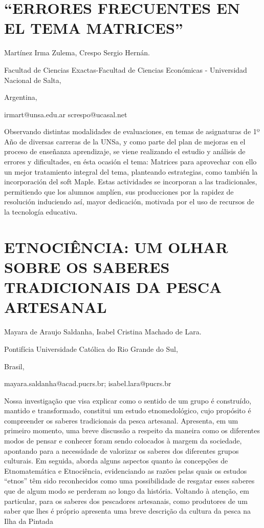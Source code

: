 \section{“ERRORES FRECUENTES EN EL TEMA MATRICES” }

\begin{datos}

Martínez Irma Zulema, Crespo Sergio Hernán.

Facultad de Ciencias Exactas-Facultad de Ciencias Económicas - Universidad
Nacional de Salta,

Argentina,

irmart@unsa.edu.ar screspo@ucasal.net 

\end{datos}

Observando distintas modalidades de evaluaciones, en temas de asignaturas
de 1º Año de diversas carreras de la UNSa, y como parte del plan de
mejoras en el proceso de enseñanza aprendizaje, se viene realizando
el estudio y análisis de errores y dificultades, en ésta ocasión el
tema: Matrices para aprovechar con ello un mejor tratamiento integral
del tema, planteando estrategias, como también la incorporación del
soft Maple. Estas actividades se incorporan a las tradicionales, permitiendo
que los alumnos amplíen, sus producciones por la rapidez de resolución
induciendo así, mayor dedicación, motivada por el uso de recursos
de la tecnología educativa. 


\section{ETNOCIÊNCIA: UM OLHAR SOBRE OS SABERES TRADICIONAIS DA PESCA ARTESANAL }

\begin{datos}

Mayara de Araujo Saldanha, Isabel Cristina Machado de Lara.

Pontifícia Universidade Católica do Rio Grande do Sul,

Brasil,

mayara.saldanha@acad.pucrs.br; isabel.lara@pucrs.br

\end{datos}

Nossa investigação que visa explicar como o sentido de um grupo é
construído, mantido e transformado, constitui um estudo etnomedológico,
cujo propósito é compreender os saberes tradicionais da pesca artesanal.
Apresenta, em um primeiro momento, uma breve discussão a respeito
da maneira como os diferentes modos de pensar e conhecer foram sendo
colocados à margem da sociedade, apontando para a necessidade de valorizar
os saberes dos diferentes grupos culturais. Em seguida, aborda alguns
aspectos quanto às concepções de Etnomatemática e Etnociência, evidenciando
as razões pelas quais os estudos “etnos” têm sido reconhecidos como
uma possibilidade de resgatar esses saberes que de algum modo se perderam
ao longo da história. Voltando à atenção, em particular, para os saberes
dos pescadores artesanais, como produtores de um saber que lhes é
próprio apresenta uma breve descrição da cultura da pesca na Ilha
da Pintada 


